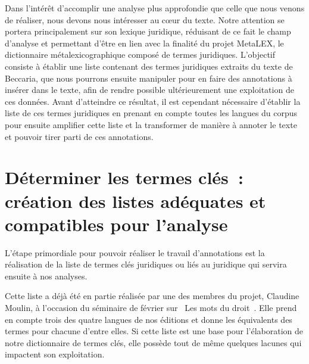 
Dans l'intérêt d'accomplir une analyse plus approfondie que celle que nous venons de réaliser, nous devons nous intéresser au cœur du texte. Notre attention se portera principalement sur son lexique juridique, réduisant de ce fait le champ d'analyse et permettant d'être en lien avec la finalité du projet MetaLEX, le dictionnaire métalexicographique composé de termes juridiques. L'objectif consiste à établir une liste contenant des termes juridiques extraits du texte de Beccaria, que nous pourrons ensuite manipuler pour en faire des annotations à insérer dans le texte, afin de rendre possible ultérieurement une exploitation de ces données. Avant d'atteindre ce résultat, il est cependant nécessaire d'établir la liste de ces termes juridiques en prenant en compte toutes les langues du corpus pour ensuite amplifier cette liste et la transformer de manière à annoter le texte et pouvoir tirer parti de ces annotations.

\section{Déterminer les termes clés~: création des listes adéquates et compatibles pour l'analyse}
L'étape primordiale pour pouvoir réaliser le travail d'annotations est la réalisation de la liste de termes clés juridiques ou liés au juridique qui servira ensuite à nos analyses.

Cette liste a déjà été en partie réalisée par une des membres du projet, Claudine Moulin, à l'occasion du séminaire de février sur \og~Les mots du droit~\fg{}. Elle prend en compte trois des quatre langues de nos éditions et donne les équivalents des termes pour chacune d'entre elles. Si cette liste est une base pour l'élaboration de notre dictionnaire de termes clés, elle possède tout de même quelques lacunes qui impactent son exploitation.

